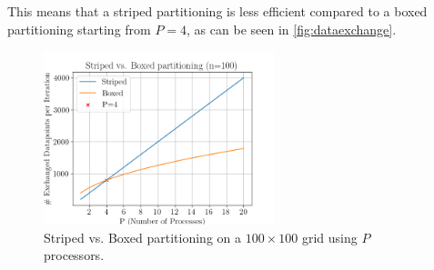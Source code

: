 This means that a striped partitioning is less efficient compared to a boxed partitioning starting from $P=4$, as can be seen in \autoref{fig:dataexchange}.\\
\begin{figure}[H]
    \centering
    \includegraphics[width=0.6\textwidth]{../fig/lab2/scale23.png}
    \caption{Striped vs. Boxed partitioning on a $100\times100$ grid using $P$ processors.}
    \label{fig:dataexchange}
\end{figure}
